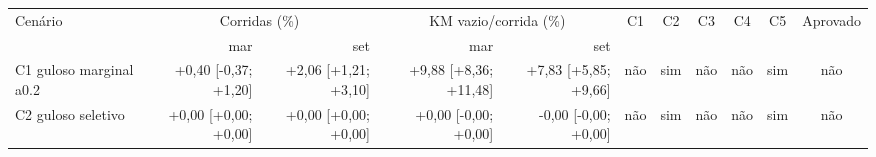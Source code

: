 \begin{tabular}{lrrrrcccccc}
\hline
Cenário & \multicolumn{2}{c}{Corridas (\%)} & \multicolumn{2}{c}{KM vazio/corrida (\%)} & C1 & C2 & C3 & C4 & C5 & Aprovado \\
 & mar & set & mar & set & & & & & & \\
\hline
C1 guloso marginal a0.2 & +0{,}40 [-0{,}37; +1{,}20] & +2{,}06 [+1{,}21; +3{,}10] & +9{,}88 [+8{,}36; +11{,}48] & +7{,}83 [+5{,}85; +9{,}66] & não & sim & não & não & sim & não \\
C2 guloso seletivo & +0{,}00 [+0{,}00; +0{,}00] & +0{,}00 [+0{,}00; +0{,}00] & +0{,}00 [-0{,}00; +0{,}00] & -0{,}00 [-0{,}00; +0{,}00] & não & sim & não & não & sim & não \\
\hline
\end{tabular}
